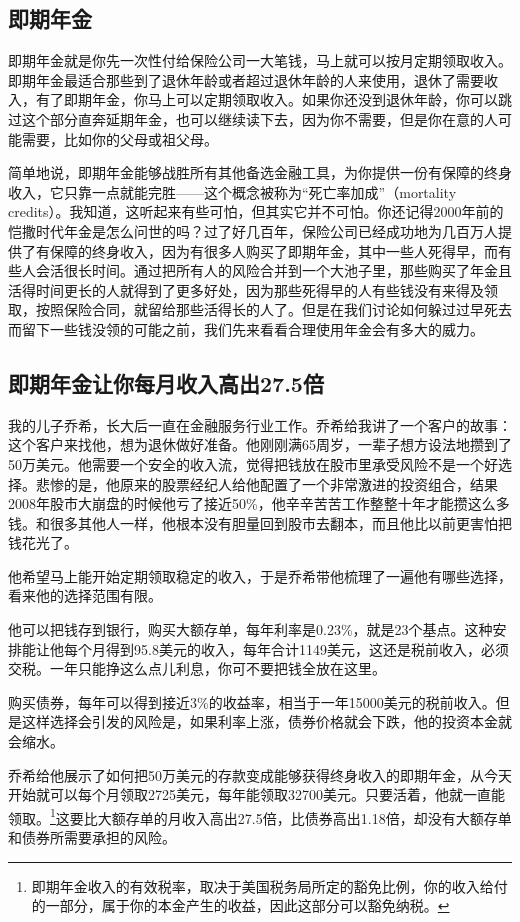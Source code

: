 \subsection{即期年金}

即期年金就是你先一次性付给保险公司一大笔钱，马上就可以按月定期领取收入。即期年金最适合那些到了退休年龄或者超过退休年龄的人来使用，退休了需要收入，有了即期年金，你马上可以定期领取收入。如果你还没到退休年龄，你可以跳过这个部分直奔延期年金，也可以继续读下去，因为你不需要，但是你在意的人可能需要，比如你的父母或祖父母。

简单地说，即期年金能够战胜所有其他备选金融工具，为你提供一份有保障的终身收入，它只靠一点就能完胜——这个概念被称为“死亡率加成”（mortality credits）。我知道，这听起来有些可怕，但其实它并不可怕。你还记得2000年前的恺撒时代年金是怎么问世的吗？过了好几百年，保险公司已经成功地为几百万人提供了有保障的终身收入，因为有很多人购买了即期年金，其中一些人死得早，而有些人会活很长时间。通过把所有人的风险合并到一个大池子里，那些购买了年金且活得时间更长的人就得到了更多好处，因为那些死得早的人有些钱没有来得及领取，按照保险合同，就留给那些活得长的人了。但是在我们讨论如何躲过过早死去而留下一些钱没领的可能之前，我们先来看看合理使用年金会有多大的威力。

\subsection{即期年金让你每月收入高出27.5倍}

我的儿子乔希，长大后一直在金融服务行业工作。乔希给我讲了一个客户的故事：这个客户来找他，想为退休做好准备。他刚刚满65周岁，一辈子想方设法地攒到了50万美元。他需要一个安全的收入流，觉得把钱放在股市里承受风险不是一个好选择。悲惨的是，他原来的股票经纪人给他配置了一个非常激进的投资组合，结果2008年股市大崩盘的时候他亏了接近50\%，他辛辛苦苦工作整整十年才能攒这么多钱。和很多其他人一样，他根本没有胆量回到股市去翻本，而且他比以前更害怕把钱花光了。

他希望马上能开始定期领取稳定的收入，于是乔希带他梳理了一遍他有哪些选择，看来他的选择范围有限。

他可以把钱存到银行，购买大额存单，每年利率是0.23\%，就是23个基点。这种安排能让他每个月得到95.8美元的收入，每年合计1149美元，这还是税前收入，必须交税。一年只能挣这么点儿利息，你可不要把钱全放在这里。

购买债券，每年可以得到接近3\%的收益率，相当于一年15000美元的税前收入。但是这样选择会引发的风险是，如果利率上涨，债券价格就会下跌，他的投资本金就会缩水。

乔希给他展示了如何把50万美元的存款变成能够获得终身收入的即期年金，从今天开始就可以每个月领取2725美元，每年能领取32700美元。只要活着，他就一直能领取。\footnote{\label{fn:pdf-29-1}即期年金收入的有效税率，取决于美国税务局所定的豁免比例，你的收入给付的一部分，属于你的本金产生的收益，因此这部分可以豁免纳税。}这要比大额存单的月收入高出27.5倍，比债券高出1.18倍，却没有大额存单和债券所需要承担的风险。

